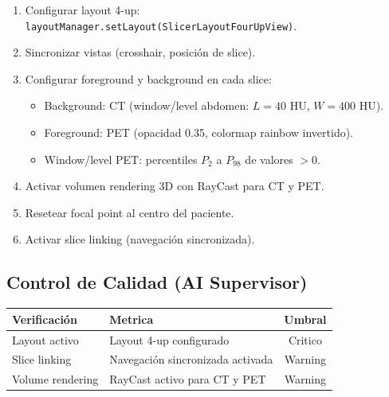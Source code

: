 \documentclass[12pt,a4paper]{article}
\begin{document}
\begin{enumerate}
    \item Configurar layout 4-up:
          \texttt{layoutManager.setLayout(SlicerLayoutFourUpView)}.
    \item Sincronizar vistas (crosshair, posición de slice).
    \item Configurar foreground y background en cada slice:
          \begin{itemize}
              \item Background: CT (window/level abdomen: $L=40$ HU, $W=400$ HU).
              \item Foreground: PET (opacidad 0.35, colormap rainbow invertido).
              \item Window/level PET: percentiles $P_2$ a $P_{98}$ de valores $>0$.
          \end{itemize}
    \item Activar volumen rendering 3D con RayCast para CT y PET.
    \item Resetear focal point al centro del paciente.
    \item Activar slice linking (navegación sincronizada).
\end{enumerate}


\subsection*{Control de Calidad (AI Supervisor)}

\begin{table}[H]
\centering
\begin{tabular}{llc}
\toprule
\textbf{Verificación} & \textbf{Metrica} & \textbf{Umbral} \\
\midrule
Layout activo & Layout 4-up configurado & Critico \\
Slice linking & Navegación sincronizada activada & Warning \\
Volume rendering & RayCast activo para CT y PET & Warning \\
\bottomrule
\end{tabular}
\end{table}

\newpage

\appendix

\newpage

\appendix
\end{document}

